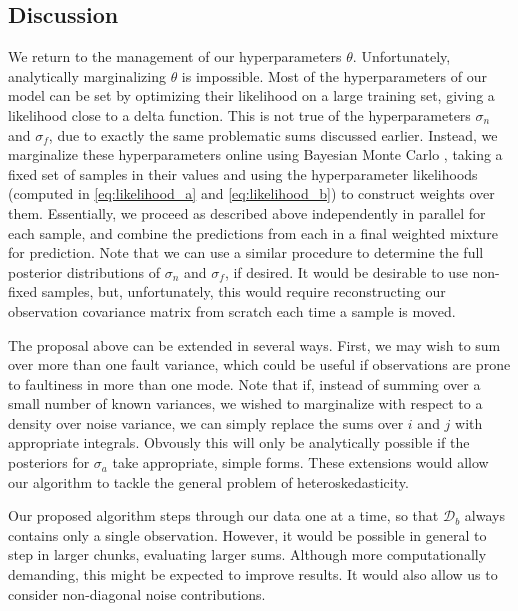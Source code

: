 \documentclass{article}
\newcommand{\cm}[1]{\ensuremath{\mathcal{#1}}}
\newcommand{\data}{\ensuremath{\cm{D}}}
\begin{document}

\subsection{Discussion}

We return to the management of our hyperparameters
$\theta$. Unfortunately, analytically marginalizing $\theta$ is
impossible. Most of the hyperparameters of our model can be set by
optimizing their likelihood on a large training set, giving a
likelihood close to a delta function. This is not true of the
hyperparameters $\sigma_n$ and $\sigma_f$, due to exactly the same
problematic sums discussed earlier. Instead, we marginalize these
hyperparameters online using Bayesian Monte Carlo \citep[Chapter
  7]{osbornebayesian}, taking a fixed set of samples in their values
and using the hyperparameter likelihoods (computed in
\eqref{eq:likelihood_a} and \eqref{eq:likelihood_b}) to construct
weights over them. Essentially, we proceed as described above
independently in parallel for each sample, and combine the predictions
from each in a final weighted mixture for prediction. Note that we can
use a similar procedure \citep{garnettosborne} to determine the full
posterior distributions of $\sigma_n$ and $\sigma_f$, if desired.  It
would be desirable to use non-fixed samples, but, unfortunately, this
would require reconstructing our observation covariance matrix from
scratch each time a sample is moved.

The proposal above can be extended in several ways. First, we may wish
to sum over more than one fault variance, which could be useful if
observations are prone to faultiness in more than one mode.  Note that
if, instead of summing over a small number of known variances, we
wished to marginalize with respect to a density over noise variance,
we can simply replace the sums over $i$ and $j$ with appropriate
integrals. Obvously this will only be analytically possible if the
posteriors for $\sigma_a$ take appropriate, simple forms.  These
extensions would allow our algorithm to tackle the general problem of
heteroskedasticity.

Our proposed algorithm steps through our data one at a time, so that
$\data_b$ always contains only a single observation. However, it would
be possible in general to step in larger chunks, evaluating larger
sums. Although more computationally demanding, this might be expected
to improve results. It would also allow us to consider non-diagonal
noise contributions.
\end{document}

